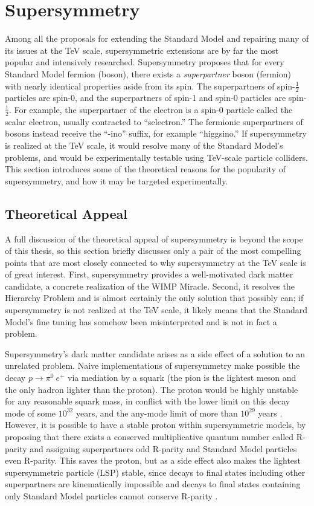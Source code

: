 \section{Supersymmetry} \label{sec:SUSY}

Among all the proposals for extending the Standard Model and repairing many of its issues at the TeV scale, supersymmetric extensions are by far the most popular and intensively researched.
Supersymmetry proposes that for every Standard Model fermion (boson), there exists a {\it superpartner} boson (fermion) with nearly identical properties aside from its spin.
The superpartners of spin-$\frac{1}{2}$ particles are spin-0, and the superpartners of spin-1 and spin-0 particles are spin-$\frac{1}{2}$.
For example, the superpartner of the electron is a spin-0 particle called the scalar electron, usually contracted to ``selectron.''
The fermionic superpartners of bosons instead receive the ``-ino'' suffix, for example ``higgsino.''
If supersymmetry is realized at the TeV scale, it would resolve many of the Standard Model's problems, and would be experimentally testable using TeV-scale particle colliders.
This section introduces some of the theoretical reasons for the popularity of supersymmetry, and how it may be targeted experimentally.

  \subsection{Theoretical Appeal} \label{sec:SUSYappeal}

  A full discussion of the theoretical appeal of supersymmetry is beyond the scope of this thesis, so this section briefly discusses only a pair of the most compelling points that are most closely connected to why supersymmetry at the TeV scale is of great interest.
  First, supersymmetry provides a well-motivated dark matter candidate, a concrete realization of the WIMP Miracle.
  Second, it resolves the Hierarchy Problem and is almost certainly the only solution that possibly can; if supersymmetry is not realized at the TeV scale, it likely means that the Standard Model's fine tuning has somehow been misinterpreted and is not in fact a problem.

  Supersymmetry's dark matter candidate arises as a side effect of a solution to an unrelated problem.
  Naive implementations of supersymmetry make possible the decay $p \rightarrow \pi^0~e^+$ via mediation by a squark (the pion is the lightest meson and the only hadron lighter than the proton).
  The proton would be highly unstable for any reasonable squark mass, in conflict with the lower limit on this decay mode of some $10^{32}$ years, and the any-mode limit of more than $10^{29}$ years \cite{pdg}.
  However, it is possible to have a stable proton within supersymmetric models, by proposing that there exists a conserved multiplicative quantum number called R-parity and assigning superpartners odd R-parity and Standard Model particles even R-parity.
  This saves the proton, but as a side effect also makes the lightest supersymmetric particle (LSP) stable, since decays to final states including other superpartners are kinematically impossible and decays to final states containing only Standard Model particles cannot conserve R-parity \cite{pdg}.

